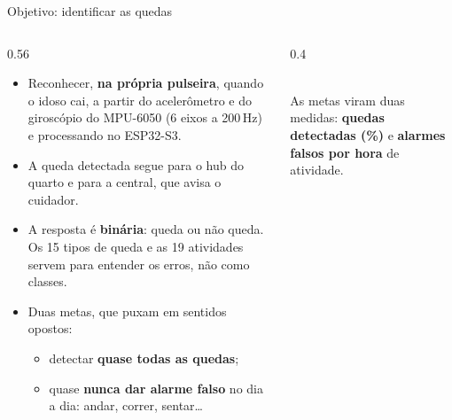 \documentclass[aspectratio=169,10pt]{beamer}
\newcommand{\nota}[1]{{\footnotesize\color{tinta2}#1}}
\begin{document}
\begin{frame}{Objetivo: identificar as quedas}
  \begin{columns}[T,onlytextwidth]
    \begin{column}{0.56\textwidth}
      \begin{itemize}
        \item Reconhecer, \textbf{na própria pulseira}, quando o idoso cai, a partir do acelerômetro e do giroscópio
              do MPU-6050 (6 eixos a 200\,Hz) e processando no ESP32-S3.
        \item A queda detectada segue para o hub do quarto e para a central, que avisa o cuidador.
        \item A resposta é \textbf{binária}: \alert{queda} ou \textcolor{atividade}{não queda}.\\
              \nota{Os 15 tipos de queda e as 19 atividades servem para entender os erros, não como classes.}
        \item Duas metas, que puxam em sentidos opostos:
          \begin{itemize}
            \item detectar \textbf{quase todas as quedas};
            \item quase \textbf{nunca dar alarme falso} no dia a dia: andar, correr, sentar\ldots
          \end{itemize}
      \end{itemize}
    \end{column}
    \begin{column}{0.4\textwidth}
      \vspace{0.2cm}
      \centering
      \\[0.3cm]
      \nota{As metas viram duas medidas: \textbf{quedas detectadas (\%)} e \textbf{alarmes falsos por hora} de
            atividade.}
    \end{column}
  \end{columns}
\end{frame}
\end{document}
